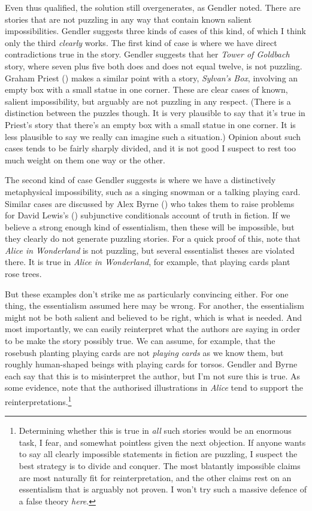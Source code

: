 \documentclass[
  10pt,
  letterpaper,
  DIV=11,
  numbers=noendperiod,
  twoside]{scrartcl}
\begin{document}
Even thus qualified, the solution still overgenerates, as Gendler noted.
There are stories that are not puzzling in any way that contain known
salient impossibilities. Gendler suggests three kinds of cases of this
kind, of which I think only the third \emph{clearly} works. The first
kind of case is where we have direct contradictions true in the story.
Gendler suggests that her \emph{Tower of Goldbach} story, where seven
plus five both does and does not equal twelve, is not puzzling. Graham
Priest () makes a similar point with a
story, \emph{Sylvan's Box}, involving an empty box with a small statue
in one corner. These are clear cases of known, salient impossibility,
but arguably are not puzzling in any respect. (There is a distinction
between the puzzles though. It is very plausible to say that it's true
in Priest's story that there's an empty box with a small statue in one
corner. It is less plausible to say we really can imagine such a
situation.) Opinion about such cases tends to be fairly sharply divided,
and it is not good I suspect to rest too much weight on them one way or
the other.

The second kind of case Gendler suggests is where we have a
distinctively metaphysical impossibility, such as a singing snowman or a
talking playing card. Similar cases are discussed by Alex Byrne
() who takes them to raise problems for
David Lewis's () subjunctive conditionals
account of truth in fiction. If we believe a strong enough kind of
essentialism, then these will be impossible, but they clearly do not
generate puzzling stories. For a quick proof of this, note that
\emph{Alice in Wonderland} is not puzzling, but several essentialist
theses are violated there. It is true in \emph{Alice in Wonderland}, for
example, that playing cards plant rose trees.

But these examples don't strike me as particularly convincing either.
For one thing, the essentialism assumed here may be wrong. For another,
the essentialism might not be both salient and believed to be right,
which is what is needed. And most importantly, we can easily reinterpret
what the authors are saying in order to be make the story possibly true.
We can assume, for example, that the rosebush planting playing cards are
not \emph{playing cards} as we know them, but roughly human-shaped
beings with playing cards for torsos. Gendler and Byrne each say that
this is to misinterpret the author, but I'm not sure this is true. As
some evidence, note that the authorised illustrations in \emph{Alice}
tend to support the reinterpretations.\footnote{Determining whether this
  is true in \emph{all} such stories would be an enormous task, I fear,
  and somewhat pointless given the next objection. If anyone wants to
  say all clearly impossible statements in fiction are puzzling, I
  suspect the best strategy is to divide and conquer. The most blatantly
  impossible claims are most naturally fit for reinterpretation, and the
  other claims rest on an essentialism that is arguably not proven. I
  won't try such a massive defence of a false theory \emph{here}.}
\end{document}
